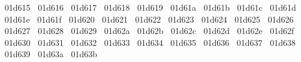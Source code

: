 {  ^^^^^^01d615%
  ^^^^^^01d616%
  ^^^^^^01d617%
  ^^^^^^01d618%
  ^^^^^^01d619%
  ^^^^^^01d61a%
  ^^^^^^01d61b%
  ^^^^^^01d61c%
  ^^^^^^01d61d%
  ^^^^^^01d61e%
  ^^^^^^01d61f%
  ^^^^^^01d620%
  ^^^^^^01d621%
  ^^^^^^01d622%
  ^^^^^^01d623%
  ^^^^^^01d624%
  ^^^^^^01d625%
  ^^^^^^01d626%
  ^^^^^^01d627%
  ^^^^^^01d628%
  ^^^^^^01d629%
  ^^^^^^01d62a%
  ^^^^^^01d62b%
  ^^^^^^01d62c%
  ^^^^^^01d62d%
  ^^^^^^01d62e%
  ^^^^^^01d62f%
  ^^^^^^01d630%
  ^^^^^^01d631%
  ^^^^^^01d632%
  ^^^^^^01d633%
  ^^^^^^01d634%
  ^^^^^^01d635%
  ^^^^^^01d636%
  ^^^^^^01d637%
  ^^^^^^01d638%
  ^^^^^^01d639%
  ^^^^^^01d63a%
  ^^^^^^01d63b%
}
